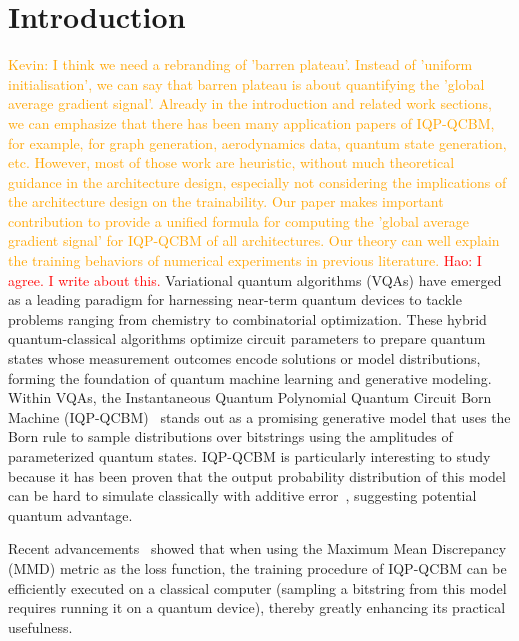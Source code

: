 \documentclass{article}
\theoremstyle{plain}
\theoremstyle{definition}
\theoremstyle{remark}
\newcommand{\hw}[1]{\textcolor{red}{Hao: #1}}
\newcommand{\ks}[1]{\textcolor{orange}{Kevin: #1}}
\begin{document}
\section{Introduction}
\ks{I think we need a rebranding of 'barren plateau'. Instead of 'uniform initialisation', we can say that barren plateau is about quantifying the 'global average gradient signal'. Already in the introduction and related work sections, we can emphasize that there has been many application papers of IQP-QCBM, for example, for graph generation, aerodynamics data, quantum state generation, etc. However, most of those work are heuristic, without much theoretical guidance in the architecture design, especially not considering the implications of the architecture design on the trainability. Our paper makes important contribution to provide a unified formula for computing the 'global average gradient signal' for IQP-QCBM of all architectures. Our theory can well explain the training behaviors of numerical experiments in previous literature.}
\hw{I agree. I write about this.}
Variational quantum algorithms (VQAs) have emerged as a leading paradigm for harnessing near-term quantum devices to tackle problems ranging from chemistry to combinatorial optimization. These hybrid quantum-classical algorithms optimize circuit parameters to prepare quantum states whose measurement outcomes encode solutions or model distributions, forming the foundation of quantum machine learning and generative modeling.
Within VQAs, the Instantaneous Quantum Polynomial Quantum Circuit Born Machine (IQP-QCBM)~\cite{shepherd09,Liu18} stands out as a promising generative model that uses the Born rule to sample distributions over bitstrings using the amplitudes of parameterized quantum states. IQP-QCBM is particularly interesting to study because it has been proven that the output probability distribution of this model can be hard to simulate classically with additive error~\cite{Bremner10, Bremner16}, suggesting potential quantum advantage.

Recent advancements~\cite{recioarmengol25} showed that when using the Maximum Mean Discrepancy (MMD) metric as the loss function, the training procedure of IQP-QCBM can be efficiently executed on a classical computer (sampling a bitstring from this model requires running it on a quantum device), thereby greatly enhancing its practical usefulness.
\end{document}

